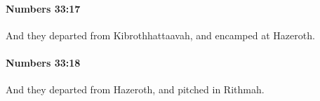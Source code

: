 		\paragraph{Numbers 33:17} %
			\label{NUMBERS-33-17}

			And they departed from Kibrothhattaavah, and encamped at Hazeroth.


		\paragraph{Numbers 33:18} %
			\label{NUMBERS-33-18}

			And they departed from Hazeroth, and pitched in Rithmah.



